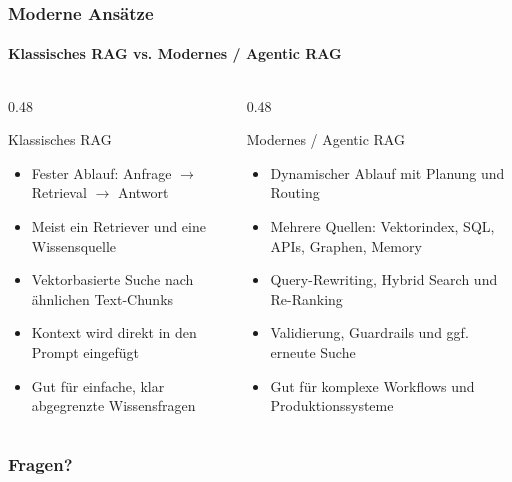 \documentclass[lecture, orange, autotoc, toc=fancy, indicatelastpageofframe, footlinebox, ignoremetaot]{rag_basic}
\begin{document}
    \begin{frame}
        \frametitle{Moderne Ansätze}
        \framesubtitle{Klassisches RAG vs. Modernes / Agentic RAG}

        \begin{columns}[T,onlytextwidth]
            \begin{column}{0.48\textwidth}
                \begin{block}{Klassisches RAG}
                    \small
                    \begin{itemize}
                        \item Fester Ablauf: \linebreak Anfrage $\rightarrow$ Retrieval $\rightarrow$ Antwort
                        \item Meist ein Retriever und eine Wissensquelle
                        \item Vektorbasierte Suche nach ähnlichen Text-Chunks
                        \item Kontext wird direkt in den Prompt eingefügt
                        \item Gut für einfache, klar abgegrenzte Wissensfragen
                    \end{itemize}
                \end{block}
            \end{column}

            \begin{column}{0.48\textwidth}
                \begin{exampleblock}{Modernes / Agentic RAG}
                    \small
                    \begin{itemize}
                        \item Dynamischer Ablauf mit Planung und Routing
                        \item Mehrere Quellen: Vektorindex, SQL, APIs, Graphen, Memory
                        \item Query-Rewriting, Hybrid Search und Re-Ranking
                        \item Validierung, Guardrails und ggf. erneute Suche
                        \item Gut für komplexe Workflows und Produktionssysteme
                    \end{itemize}
                \end{exampleblock}
            \end{column}
        \end{columns}
    \end{frame}

    \begin{frame}
        \frametitle{Fragen?}
        \begin{center}
        \end{center}

    \end{frame}

    \begin{thankyouframe}
    \end{thankyouframe}
\end{document}
